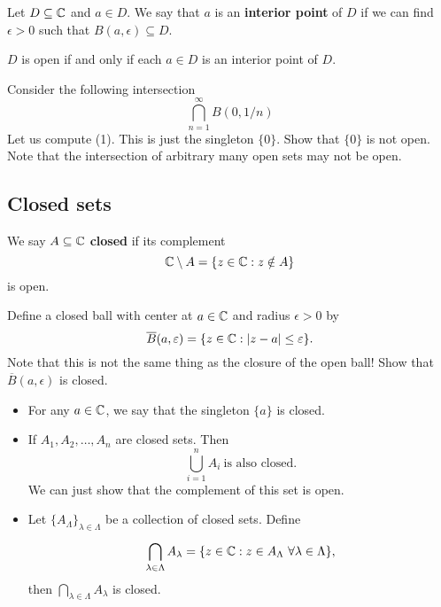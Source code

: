 \documentclass[a4paper]{report}
\begin{document}
\begin{definition}
  Let \( D \subseteq \mathbb{C} \) and \( a \in D  \). We say that \( a  \) is an \textbf{interior point} of \( D  \) if we can find \( \epsilon > 0  \) such that \( B(a, \epsilon) \subseteq  D  \).
\end{definition}

\begin{prop}
    \( D  \) is open if and only if each \( a \in D  \) is an interior point of \( D  \).
\end{prop}

\begin{eg}
    Consider the following intersection 
    \[  \bigcap_{ n=1  }^{ \infty  }  B(0,1/n)   \tag{1} \]
    Let us compute (1). This is just the singleton \( \{ 0 \}  \). Show that \( \{ 0  \}  \) is not open. Note that the intersection of arbitrary many open sets may not be open. 
\end{eg}

\subsection{Closed sets}\label{Closed Sets}


\begin{definition}
    We say \( A \subseteq \mathbb{C}   \) \textbf{closed} if its complement     
    \[  \mathbb{C} \setminus  A = \{ z \in \mathbb{C} : z \notin A  \}   \] is open.
\end{definition}
\begin{eg}
    Define a closed ball with center at \( a \in \mathbb{C}  \) and radius \( \epsilon > 0  \) by
    \[  \overline{B}(a, \varepsilon) = \{ z \in \mathbb{C} : | z - a  | \leq \varepsilon \}. \]
    Note that this is not the same thing as the closure of the open ball! Show that \( \overline{B}(a,\epsilon) \) is closed.
\end{eg}
\begin{eg}
    \begin{itemize}
\item For any \( a \in \mathbb{C}  \), we say that the singleton \( \{ a  \}   \) is closed.
\item If \( {A}_{1}, {A}_{2}, \dots, {A}_{n} \) are closed sets. Then 
    \[  \bigcup_{ i =1  }^{ n }  {A}_{i} \ \text{is also closed.} \]
    We can just show that the complement of this set is open.
\item Let \( \{ {A}_{\Lambda} \}_{\lambda \in \Lambda}   \) be a collection of closed sets. Define
    \[  \bigcap_{ \lambda \in \Lambda }^{  }  {A}_{\lambda} = \{ z \in \mathbb{C} : z \in {A}_{\Lambda} \ \forall \lambda \in \Lambda \},  \]
    then \( \bigcap_{  \lambda \in \Lambda }^{  } {A}_{\lambda } \) is closed.
\end{itemize}
\end{eg}
\end{document}
